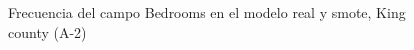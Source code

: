 \begin{figure}[H]
    \centering
    
    \caption{Frecuencia del campo Bedrooms en el modelo real y smote, King county (A-2)}
    \label{frecuency-smote-bedrooms}
\end{figure}
